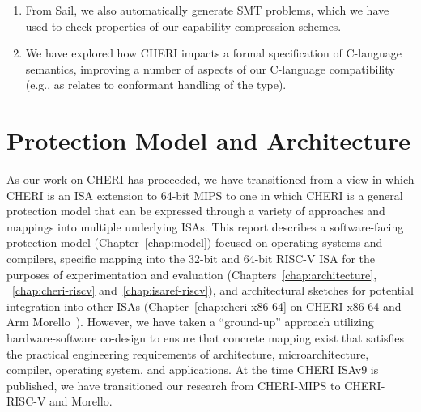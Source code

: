\begin{enumerate}

\item From Sail, we also automatically generate SMT problems, which we
  have used to check properties of our capability compression
  schemes. 


\item We have explored how CHERI impacts a formal specification of C-language
  semantics, improving a number of aspects of our C-language compatibility
  (e.g., as relates to conformant handling of the  type).
\end{enumerate}


\section{Protection Model and Architecture}

As our work on CHERI has proceeded, we have transitioned from a view in which
CHERI is an ISA extension to 64-bit MIPS to one in which CHERI is a general
protection model that can be expressed through a variety of approaches
and mappings into multiple underlying ISAs.
This report describes a software-facing protection model
(Chapter~\ref{chap:model}) focused on operating systems and compilers,
specific mapping into the 32-bit and 64-bit RISC-V ISA for the purposes of experimentation
and evaluation (Chapters~\ref{chap:architecture}, ~\ref{chap:cheri-riscv}
and~\ref{chap:isaref-riscv}), and architectural sketches for potential integration
into other ISAs (Chapter~\ref{chap:cheri-x86-64} on CHERI-x86-64 and Arm
Morello~\cite{arm-morello}).
However, we have taken a ``ground-up'' approach utilizing hardware-software
co-design to ensure that concrete mapping exist that
satisfies the practical engineering requirements of architecture,
microarchitecture, compiler, operating system, and applications.
At the time CHERI ISAv9 is published, we have transitioned
our research from CHERI-MIPS to CHERI-RISC-V and Morello.

